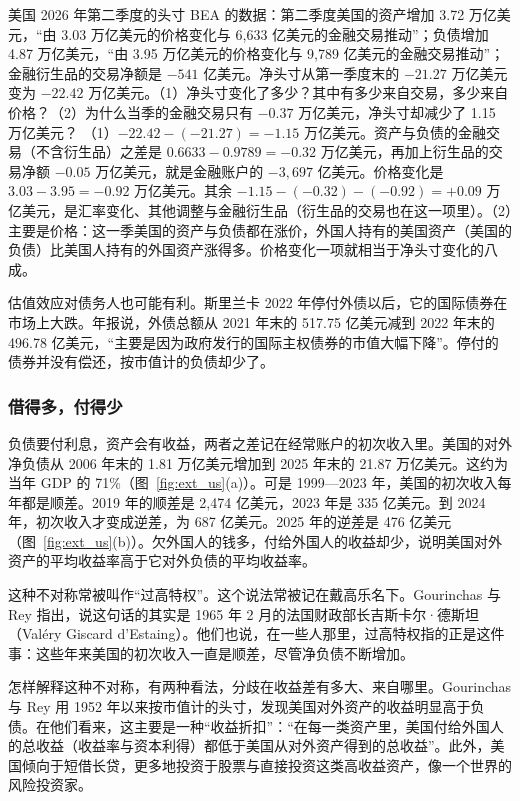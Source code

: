 \begin{example}{美国 2026 年第二季度的头寸}\label{ex:external-us}
BEA 的数据：第二季度美国的资产增加 3.72 万亿美元，“由 3.03 万亿美元的价格变化与 6,633 亿美元的金融交易推动”；负债增加 4.87 万亿美元，“由 3.95 万亿美元的价格变化与 9,789 亿美元的金融交易推动”\cite{bea2026q2}；金融衍生品的交易净额是 $-541$ 亿美元。净头寸从第一季度末的 $-21.27$ 万亿美元变为 $-22.42$ 万亿美元\cite{bea2026q2}。（1）净头寸变化了多少？其中有多少来自交易，多少来自价格？（2）为什么当季的金融交易只有 $-0.37$ 万亿美元，净头寸却减少了 1.15 万亿美元？
\solution （1）$-22.42-(-21.27)=-1.15$ 万亿美元。资产与负债的金融交易（不含衍生品）之差是 $0.6633-0.9789=-0.32$ 万亿美元，再加上衍生品的交易净额 $-0.05$ 万亿美元，就是金融账户的 $-3,697$ 亿美元。价格变化是 $3.03-3.95=-0.92$ 万亿美元。其余 $-1.15-(-0.32)-(-0.92)=+0.09$ 万亿美元，是汇率变化、其他调整与金融衍生品（衍生品的交易也在这一项里）。（2）主要是价格：这一季美国的资产与负债都在涨价，外国人持有的美国资产（美国的负债）比美国人持有的外国资产涨得多。价格变化一项就相当于净头寸变化的八成。
\end{example}

估值效应对债务人也可能有利。斯里兰卡 2022 年停付外债以后，它的国际债券在市场上大跌。年报说，外债总额从 2021 年末的 517.75 亿美元减到 2022 年末的 496.78 亿美元，“主要是因为政府发行的国际主权债券的市值大幅下降”\cite{cbsl2023ar}。停付的债券并没有偿还，按市值计的负债却少了。

\subsubsection{借得多，付得少}
负债要付利息，资产会有收益，两者之差记在经常账户的初次收入里。美国的对外净负债从 2006 年末的 1.81 万亿美元增加到 2025 年末的 21.87 万亿美元。这约为当年 GDP 的 71\%（图~\ref{fig:ext_us}(a)）\cite{fred2026x,wdi2026}。可是 1999—2023 年，美国的初次收入每年都是顺差。2019 年的顺差是 2,474 亿美元，2023 年是 335 亿美元。到 2024 年，初次收入才变成逆差，为 687 亿美元。2025 年的逆差是 476 亿美元（图~\ref{fig:ext_us}(b)）\cite{fred2026x}。欠外国人的钱多，付给外国人的收益却少，说明美国对外资产的平均收益率高于它对外负债的平均收益率。

这种不对称常被叫作“过高特权”。这个说法常被记在戴高乐名下。Gourinchas 与 Rey 指出，说这句话的其实是 1965 年 2 月的法国财政部长吉斯卡尔·德斯坦（Valéry Giscard d'Estaing）。他们也说，在一些人那里，过高特权指的正是这件事：这些年来美国的初次收入一直是顺差，尽管净负债不断增加\cite{gourinchas2005}。

怎样解释这种不对称，有两种看法，分歧在收益差有多大、来自哪里。Gourinchas 与 Rey 用 1952 年以来按市值计的头寸，发现美国对外资产的收益明显高于负债。在他们看来，这主要是一种“收益折扣”：“在每一类资产里，美国付给外国人的总收益（收益率与资本利得）都低于美国从对外资产得到的总收益”。此外，美国倾向于短借长贷，更多地投资于股票与直接投资这类高收益资产，像一个世界的风险投资家\cite{gourinchas2005}。

